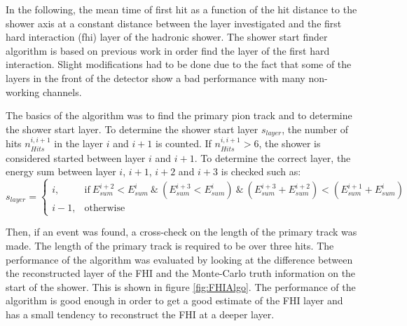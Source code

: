 In the following, the mean time of first hit as a function of the hit distance to the shower axis at a constant distance between the layer investigated and the first hard interaction (\acrshort{fhi}) layer of the hadronic shower. The shower start finder algorithm is based on previous work \cite{CaN026} in order find the layer of the first hard interaction. Slight modifications had to be done due to the fact that some of the layers in the front of the detector show a bad performance with many non-working channels.

The basics of the algorithm was to find the primary pion track and to determine the shower start layer. To determine the shower start layer $s_{layer}$, the number of hits $n_{Hits}^{i, i+1}$ in the layer $i$ and $i+1$ is counted. If $n_{Hits}^{i, i+1} > 6$, the shower is considered started between layer $i$ and $i+1$. To determine the correct layer, the energy sum between layer $i$, $i+1$, $i+2$ and $i+3$ is checked such as:
\begin{equation*}
	s_{layer} =
	\begin{cases}
		i, & \text{if} \: E_{sum}^{i+2} < E_{sum}^{i} \:\&\: (E_{sum}^{i+3} < E_{sum}^{i}) \:\&\: (E_{sum}^{i+3} + E_{sum}^{i+2}) < (E_{sum}^{i+1} + E_{sum}^{i}) \\
		i-1, & \text{otherwise}
	\end{cases}
\end{equation*}

Then, if an event was found, a cross-check on the length of the primary track was made. The length of the primary track is required to be over three hits. The performance of the algorithm was evaluated by looking at the difference between the reconstructed layer of the FHI and the Monte-Carlo truth information on the start of the shower. This is shown in figure \ref{fig:FHIAlgo}. The performance of the algorithm is good enough in order to get a good estimate of the FHI layer and has a small tendency to reconstruct the FHI at a deeper layer.

